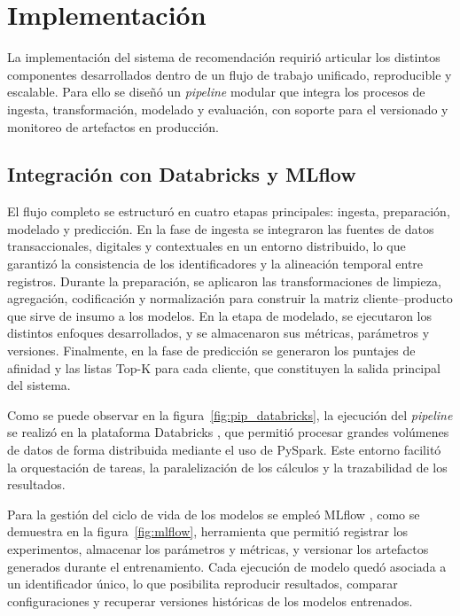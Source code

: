 \section{Implementación}

La implementación del sistema de recomendación requirió articular los distintos componentes desarrollados dentro de un flujo de trabajo unificado, reproducible y escalable. Para ello se diseñó un \textit{pipeline} modular que integra los procesos de ingesta, transformación, modelado y evaluación, con soporte para el versionado y monitoreo de artefactos en producción.

\subsection{Integración con Databricks y MLflow}

El flujo completo se estructuró en cuatro etapas principales: ingesta, preparación, modelado y predicción. En la fase de ingesta se integraron las fuentes de datos transaccionales, digitales y contextuales en un entorno distribuido, lo que garantizó la consistencia de los identificadores y la alineación temporal entre registros. Durante la preparación, se aplicaron las transformaciones de limpieza, agregación, codificación y normalización para construir la matriz cliente–producto que sirve de insumo a los modelos. En la etapa de modelado, se ejecutaron los distintos enfoques desarrollados, y se almacenaron sus métricas, parámetros y versiones. Finalmente, en la fase de predicción se generaron los puntajes de afinidad y las
listas Top-K para cada cliente, que constituyen la salida principal del sistema.

Como se puede observar en la figura~\ref{fig:pip_databricks}, la ejecución del \textit{pipeline} se realizó en la plataforma Databricks \cite{ARTICLE:Databricks}, que permitió procesar grandes volúmenes de datos de forma distribuida mediante el uso de PySpark. Este entorno facilitó la orquestación de tareas, la paralelización de los cálculos y la trazabilidad de los resultados. 

Para la gestión del ciclo de vida de los modelos se empleó MLflow \cite{ARTICLE:MLflow2018}, como se demuestra en la figura~\ref{fig:mlflow}, herramienta que permitió registrar los experimentos, almacenar los parámetros y métricas, y versionar los artefactos generados durante el entrenamiento. Cada ejecución de modelo quedó asociada a un identificador único, lo que posibilita reproducir resultados, comparar configuraciones y recuperar versiones históricas de los modelos entrenados.  

